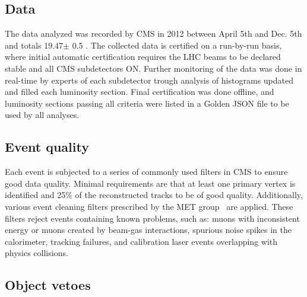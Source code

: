 \subsection{Data}
The data analyzed was recorded by CMS in 2012 between April 5th and Dec. 5th and
totals 19.47$\pm$ 0.5 \fbinv. The collected data is certified on a run-by-run 
basis, where initial automatic certification requires the LHC beams to be declared
stable and all CMS subdetectors ON. Further monitoring of the data was done in real-time
by experts of each subdetector trough analysis of histograms updated and filled
each luminosity section. Final certification was done offline, and luminosity sections passing
all criteria were listed in a Golden JSON file to be used by all analyses. 

\subsection{Event quality\label{sec:met-filters}}

Each event is subjected to a series of commonly used filters in CMS to ensure good
data quality. Minimal requirements are that at least one primary vertex is identified 
and 25\% of the reconstructed tracks to be of good quality. Additionally, various event 
cleaning filters prescribed by the MET group~\cite{ref:MET-filters} are applied. These 
filters reject events containing known problems, such as: muons with inconsistent energy or 
muons created by beam-gas interactions, spurious noise spikes in the calorimeter, tracking
failures, and calibration laser events overlapping with physics collisions. 





\subsection{Object vetoes\label{sec:vetoes}}

